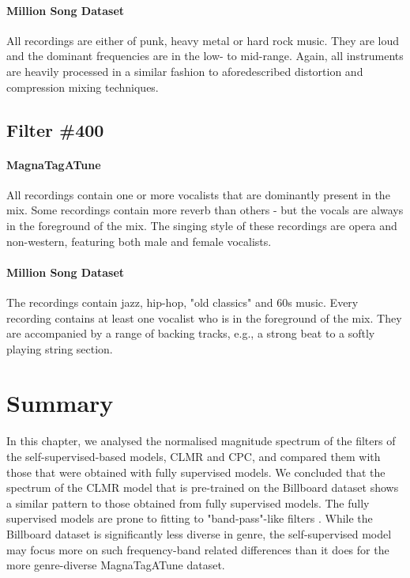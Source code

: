 \paragraph{Million Song Dataset}
All recordings are either of punk, heavy metal or hard rock music. They are loud and the dominant frequencies are in the low- to mid-range. Again, all instruments are heavily processed in a similar fashion to aforedescribed distortion and compression mixing techniques.


\subsection*{Filter \#400}
\paragraph{MagnaTagATune}
All recordings contain one or more vocalists that are dominantly present in the mix. Some recordings contain more reverb than others - but the vocals are always in the foreground of the mix. The singing style of these recordings are opera and non-western, featuring both male and female vocalists.

\paragraph{Million Song Dataset}
The recordings contain jazz, hip-hop, "old classics" and 60s music. Every recording contains at least one vocalist who is in the foreground of the mix. They are accompanied by a range of backing tracks, e.g., a strong beat to a softly playing string section.




\section*{Summary}
In this chapter, we analysed the normalised magnitude spectrum of the filters of the self-supervised-based models, CLMR and CPC, and compared them with those that were obtained with fully supervised models. We concluded that the spectrum of the CLMR model that is pre-trained on the Billboard dataset shows a similar pattern to those obtained from fully supervised models. The fully supervised models are prone to fitting to "band-pass"-like filters \cite{lee2018samplecnn}. While the Billboard dataset is significantly less diverse in genre, the self-supervised model may focus more on such frequency-band related differences than it does for the more genre-diverse MagnaTagATune dataset.

